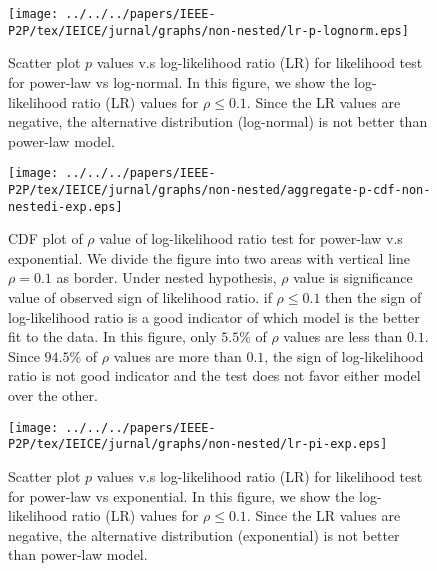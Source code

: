 \begin{figure}[!tb]
\begin{center}
\texttt{[image: ../../../papers/IEEE-P2P/tex/IEICE/jurnal/graphs/non-nested/lr-p-lognorm.eps]}
\end{center}
\caption{Scatter plot $p$ values v.s log-likelihood
         ratio (LR) for likelihood test for power-law vs log-normal.
         In this figure, we show the log-likelihood ratio (LR) values for $\rho \le 0.1$.
         Since the LR values are negative, the alternative distribution (log-normal) is not better than power-law model.} 
\label{fig:scatter-lognorm}
\end{figure}

\begin{figure}[!tb]
\begin{center}
\texttt{[image: ../../../papers/IEEE-P2P/tex/IEICE/jurnal/graphs/non-nested/aggregate-p-cdf-non-nestedi-exp.eps]}
\end{center}
\caption{CDF plot of $\rho$ value of log-likelihood ratio test for power-law v.s exponential.
		We divide the figure into two areas with vertical line  $\rho=0.1$ as border.
		Under nested hypothesis, $\rho$ value is significance value of observed sign of likelihood ratio.
        if $\rho \le 0.1$ then the sign of log-likelihood ratio is a good indicator of which model is the better fit to the data.
        In this figure, only $5.5\%$ of $\rho$ values are less than $0.1$.
        Since $94.5\%$ of $\rho$ values are more than $0.1$, the sign of log-likelihood ratio is not good indicator and the test does not favor either model over the other.  
		} 
\label{fig:cdf-p-exp}
\end{figure}

\begin{figure}[!tb]
\begin{center}
\texttt{[image: ../../../papers/IEEE-P2P/tex/IEICE/jurnal/graphs/non-nested/lr-pi-exp.eps]}
\end{center}
\caption{Scatter plot $p$ values v.s log-likelihood 
         ratio (LR) for likelihood test for power-law vs exponential.
         In this figure, we show the log-likelihood ratio (LR) values for $\rho \le 0.1$.
         Since the LR values are negative, the alternative distribution (exponential) is not better than power-law model.
         } 
\label{fig:scatter-exp}
\end{figure}

